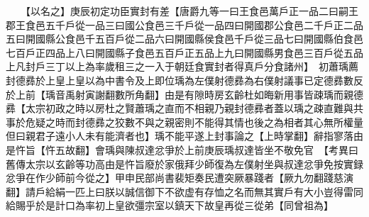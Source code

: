 　　【以名之】庚辰初定功臣實封有差【唐爵九等一曰王食邑萬戶正一品二曰嗣王郡王食邑五千戶從一品三曰國公食邑三千戶從一品四曰開國郡公食邑二千戶正二品五曰開國縣公食邑千五百戶從二品六曰開國縣侯食邑千戶從三品七曰開國縣伯食邑七百戶正四品上八曰開國縣子食邑五百戶正五品上九曰開國縣男食邑三百戶從五品上凡封戶三丁以上為率歲租三之一入于朝廷食實封者得真戶分食諸州】　初蕭瑀薦封德彞於上皇上皇以為中書令及上即位瑀為左僕射德彞為右僕射議事已定德彞數反於上前【瑀音禹射寅謝翻數所角翻】由是有隙時房玄齡杜如晦新用事皆疎瑀而親德彞【太宗初政之時以房杜之賢蕭瑀之直而不相親乃親封德彞者蓋以瑀之疎直難與共事於危疑之時而封德彞之狡數不與之親密則不能得其情也後之為相者其心無所權量但曰親君子遠小人未有能濟者也】瑀不能平遂上封事論之【上時掌翻】辭指寥落由是忤旨【忤五故翻】會瑀與陳叔達忿爭於上前庚辰瑀叔達皆坐不敬免官　【考異曰舊傳太宗以玄齡等功高由是忤旨廢於家俄拜少師復為左僕射坐與叔達忿爭免按實録忿爭在作少師前今從之】甲申民部尚書裴矩奏民遭突厥暴踐者【厥九勿翻踐慈演翻】請戶給絹一匹上曰朕以誠信御下不欲虚有存恤之名而無其實戶有大小豈得雷同給賜乎於是計口為率初上皇欲彊宗室以鎮天下故皇再從三從弟【同曾祖為】

